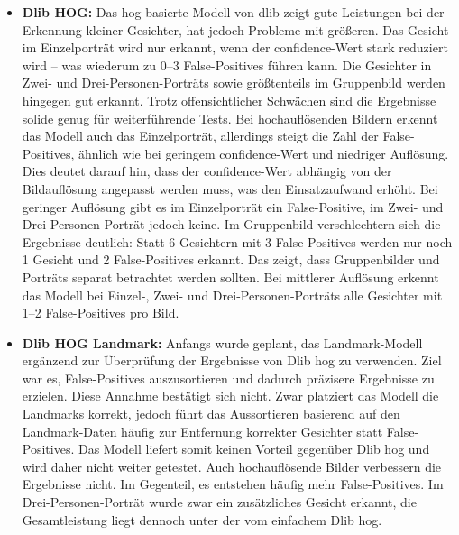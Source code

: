 \begin{itemize}
%	
	\item \textbf{Dlib HOG:} Das \gls{hog}-basierte Modell von dlib zeigt gute Leistungen bei der Erkennung kleiner Gesichter, hat jedoch Probleme mit größeren. Das Gesicht im Einzelporträt wird nur erkannt, wenn der \gls{confidence}-Wert stark reduziert wird – was wiederum zu 0–3 False-Positives führen kann. Die Gesichter in Zwei- und Drei-Personen-Porträts sowie größtenteils im Gruppenbild werden hingegen gut erkannt. Trotz offensichtlicher Schwächen sind die Ergebnisse solide genug für weiterführende Tests. Bei hochauflösenden Bildern erkennt das Modell auch das Einzelporträt, allerdings steigt die Zahl der False-Positives, ähnlich wie bei geringem \gls{confidence}-Wert und niedriger Auflösung. Dies deutet darauf hin, dass der \gls{confidence}-Wert abhängig von der Bildauflösung angepasst werden muss, was den Einsatzaufwand erhöht. Bei geringer Auflösung gibt es im Einzelporträt ein False-Positive, im Zwei- und Drei-Personen-Porträt jedoch keine. Im Gruppenbild verschlechtern sich die Ergebnisse deutlich: Statt 6 Gesichtern mit 3 False-Positives werden nur noch 1 Gesicht und 2 False-Positives erkannt. Das zeigt, dass Gruppenbilder und Porträts separat betrachtet werden sollten. Bei mittlerer Auflösung erkennt das Modell bei Einzel-, Zwei- und Drei-Personen-Porträts alle Gesichter mit 1–2 False-Positives pro Bild.
%	
	\item \textbf{Dlib HOG Landmark:} Anfangs wurde geplant, das Landmark-Modell ergänzend zur Überprüfung der Ergebnisse von Dlib \gls{hog} zu verwenden. Ziel war es, False-Positives auszusortieren und dadurch präzisere Ergebnisse zu erzielen. Diese Annahme bestätigt sich nicht. Zwar platziert das Modell die Landmarks korrekt, jedoch führt das Aussortieren basierend auf den Landmark-Daten häufig zur Entfernung korrekter Gesichter statt False-Positives. Das Modell liefert somit keinen Vorteil gegenüber Dlib \gls{hog} und wird daher nicht weiter getestet. Auch hochauflösende Bilder verbessern die Ergebnisse nicht. Im Gegenteil, es entstehen häufig mehr False-Positives. Im Drei-Personen-Porträt wurde zwar ein zusätzliches Gesicht erkannt, die Gesamtleistung liegt dennoch unter der vom einfachem Dlib \gls{hog}.
%	

\end{itemize}
